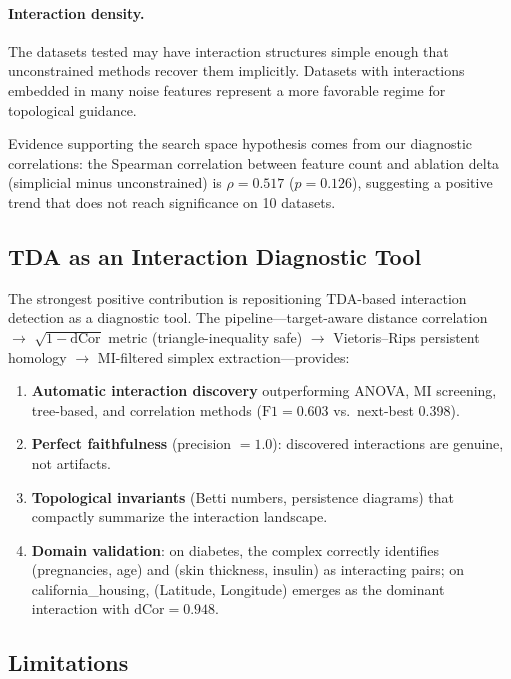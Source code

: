 \documentclass[11pt,letterpaper]{article}
\begin{document}
\paragraph{Interaction density.}
The datasets tested may have interaction structures simple enough that unconstrained methods recover them implicitly. Datasets with interactions embedded in many noise features represent a more favorable regime for topological guidance.

Evidence supporting the search space hypothesis comes from our diagnostic correlations: the Spearman correlation between feature count and ablation delta (simplicial minus unconstrained) is $\rho = 0.517$ ($p = 0.126$), suggesting a positive trend that does not reach significance on 10 datasets.

\subsection{TDA as an Interaction Diagnostic Tool}
\label{sec:diagnostic}

The strongest positive contribution is repositioning TDA-based interaction detection as a diagnostic tool. The pipeline---target-aware distance correlation $\to$ $\sqrt{1 - \text{dCor}}$ metric (triangle-inequality safe) $\to$ Vietoris--Rips persistent homology $\to$ MI-filtered simplex extraction---provides:

\begin{enumerate}
    \item \textbf{Automatic interaction discovery} outperforming ANOVA, MI screening, tree-based, and correlation methods ($\text{F1} = 0.603$ vs.\ next-best 0.398).
    \item \textbf{Perfect faithfulness} (precision $= 1.0$): discovered interactions are genuine, not artifacts.
    \item \textbf{Topological invariants} (Betti numbers, persistence diagrams) that compactly summarize the interaction landscape.
    \item \textbf{Domain validation}: on diabetes, the complex correctly identifies (pregnancies, age) and (skin thickness, insulin) as interacting pairs; on california\_housing, (Latitude, Longitude) emerges as the dominant interaction with $\text{dCor} = 0.948$.
\end{enumerate}

\subsection{Limitations}
\label{sec:limitations}
\end{document}
